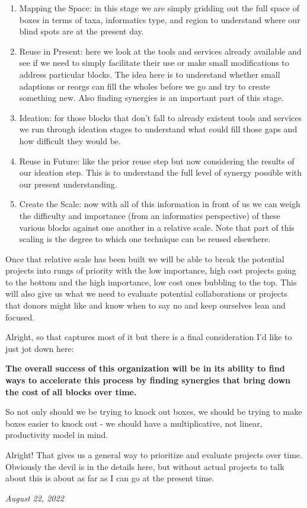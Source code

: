 \documentclass[10pt,a5paper]{book}
\begin{document}
\begin{enumerate}
\item {Mapping the Space}: in this stage we are simply gridding out the full space of boxes in terms of taxa, informatics type, and region to understand where our blind spots are at the present day.
\item {Reuse in Present}: here we look at the tools and services already available and see if we need to simply facilitate their use or make small modifications to address particular blocks. The idea here is to understand whether small adaptions or reorgs can fill the wholes before we go and try to create something new. Also finding synergies is an important part of this stage.
\item {Ideation}: for those blocks that don't fall to already existent tools and services we run through ideation stages to understand what could fill those gaps and how difficult they would be. 
\item {Reuse in Future}: like the prior reuse step but now considering the results of our ideation step. This is to understand the full level of synergy possible with our present understanding.
\item {Create the Scale}: now with all of this information in front of us we can weigh the difficulty and importance (from an informatics perspective) of these various blocks against one another in a relative scale. Note that part of this scaling is the degree to which one technique can be reused elsewhere. 
\end{enumerate}

Once that relative scale has been built we will be able to break the potential projects into rungs of priority with the low importance, high cost projects going to the bottom and the high importance, low cost ones bubbling to the top. This will also give us what we need to evaluate potential collaborations or projects that donors might like and know when to say no and keep ourselves lean and focused. 

Alright, so that captures most of it but there is a final consideration I'd like to just jot down here: \linebreak

\textbf{The overall success of this organization will be in its ability to find ways to accelerate this process by finding synergies that bring down the cost of all blocks over time.} \linebreak

So not only should we be trying to knock out boxes, we should be trying to make boxes easier to knock out - we should have a multiplicative, not linear, productivity model in mind. 

Alright! That gives us a general way to prioritize and evaluate projects over time. Obviously the devil is in the details here, but without actual projects to talk about this is about as far as I can go at the present time. 

\textit{August 22, 2022}
\end{document}
